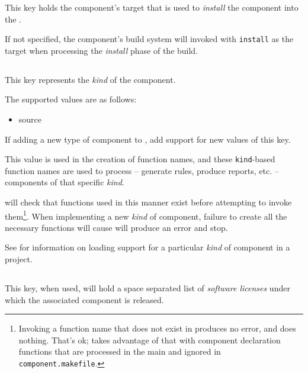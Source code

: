 This key holds the component's \makefile target that is used to
\emph{install} the component into the \destdir.

If not specified, the component's build system will invoked with
\texttt{install} as the target when processing the \emph{install}
phase of the build.


\subsection{}\label{variables:kind}

This key represents the \emph{kind} of the component.

The supported values are as follows:

\begin{itemize}
\item source
\end{itemize}

If adding a new type of component to \lmsbw, add support for new
values of this key.

This value is used in the creation of function names, and these
\texttt{kind}-based function names are used to process -- generate
rules, produce reports, etc. -- components of that specific
\emph{kind}.

\lmsbw will check that functions used in this manner exist before
attempting to invoke them\footnote{Invoking a function name that does
  not exist in \gnumake produces no error, and does nothing.  That's
  ok; \lmsbw takes advantage of that with component declaration
  functions that are processed in the main \makefile and ignored in
  \texttt{component.makefile}.}.  When implementing a new \emph{kind}
of component, failure to create all the necessary functions will cause
\lmsbw will produce an error and stop.

See  for information on
loading support for a particular \emph{kind} of component in a
project.


\subsection{}\label{variables:license}

This key, when used, will hold a space separated list of
\emph{software licenses} under which the associated component is
released.

